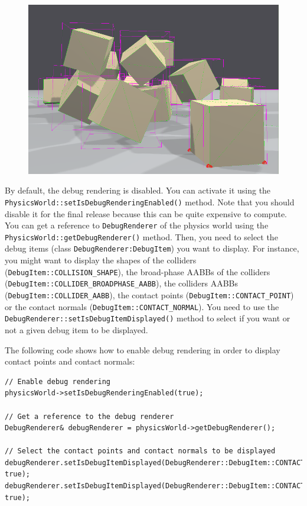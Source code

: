 \documentclass[a4paper,12pt]{article}
\begin{document}
  \begin{figure}[!ht]
      \centering
      \includegraphics[scale=0.45]{DebugRendering.png}
       \label{fig:debugrendering}
  \end{figure}

  \begin{sloppypar}
   By default, the debug rendering is disabled. You can activate it using the \texttt{PhysicsWorld::setIsDebugRenderingEnabled()} method. Note that you
   should disable it for the final release because this can be quite expensive to compute. You can get a reference to \texttt{DebugRenderer} of the physics
   world using the \texttt{PhysicsWorld::getDebugRenderer()} method. Then, you need to select the debug items
   (class \texttt{DebugRenderer:DebugItem}) you want to display. For instance, you might want to display the shapes of the colliders
   (\texttt{DebugItem::COLLISION\_SHAPE}), the broad-phase AABBs of the colliders (\texttt{DebugItem::COLLIDER\_BROADPHASE\_AABB}), the colliders AABBs
   (\texttt{DebugItem::COLLIDER\_AABB}), the contact points (\texttt{DebugItem::CONTACT\_POINT}) or the contact normals (\texttt{DebugItem::CONTACT\_NORMAL}).
   You need to use the \texttt{DebugRenderer::setIsDebugItemDisplayed()} method to select if you want or not a given debug item to be displayed. \\
  \end{sloppypar}

  The following code shows how to enable debug rendering in order to display contact points and contact normals: \\

    \begin{lstlisting}
// Enable debug rendering
physicsWorld->setIsDebugRenderingEnabled(true);

// Get a reference to the debug renderer
DebugRenderer& debugRenderer = physicsWorld->getDebugRenderer();

// Select the contact points and contact normals to be displayed
debugRenderer.setIsDebugItemDisplayed(DebugRenderer::DebugItem::CONTACT_POINT, true);
debugRenderer.setIsDebugItemDisplayed(DebugRenderer::DebugItem::CONTACT_NORMAL, true);
    \end{lstlisting}
\end{document}
